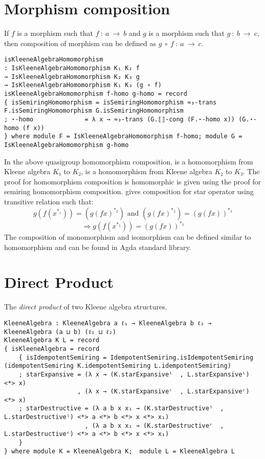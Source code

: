 \section{Morphism composition}
If $f$ is a morphism such that $f\ :\ a \ \rightarrow \ b$ and $g$ is a morphism
such that $g\ :\ b\ \rightarrow \ c$, then composition of morphism can be
defined as $g \ ∘\ f\ :\ a \ \rightarrow \ c$.
\begin{verbatim}
isKleeneAlgebraHomomorphism
: IsKleeneAlgebraHomomorphism K₁ K₂ f
→ IsKleeneAlgebraHomomorphism K₂ K₃ g
→ IsKleeneAlgebraHomomorphism K₁ K₃ (g ∘ f)
isKleeneAlgebraHomomorphism f-homo g-homo = record
{ isSemiringHomomorphism = isSemiringHomomorphism ≈₃-trans F.isSemiringHomomorphism G.isSemiringHomomorphism
; ⋆-homo              = λ x → ≈₃-trans (G.⟦⟧-cong (F.⋆-homo x)) (G.⋆-homo (f x))
} where module F = IsKleeneAlgebraHomomorphism f-homo; module G = IsKleeneAlgebraHomomorphism g-homo
\end{verbatim}
In the above quasigroup homomorphism composition,  is a homomorphism
from Kleene algebra $K₁$ to $K₂$,  is a homomorphism from Kleene
algebra $K₂$ to $K₃$. The proof for homomorphism composition is homomorphic is
given using the proof for semiring homomorphism composition. 
gives composition for star operator using transitive relation such that: 
\[g (f (x^{*_1})) = (g (f x) ^{*_2}) \text{ and } (g (f x) ^{*_2}) = (g (f x))^{*_3}\] 
\[\Rightarrow g (f (x^{*_1})) = (g (f x))^{*_3}\] The composition of
monomorphism and isomorphism can be defined similar to homomorphism and can be
found in Agda standard library.

\section{Direct Product}
The \textit{direct product} of two Kleene algebra structures.
\begin{verbatim}
KleeneAlgebra : KleeneAlgebra a ℓ₁ → KleeneAlgebra b ℓ₂ → KleeneAlgebra (a ⊔ b) (ℓ₁ ⊔ ℓ₂)
KleeneAlgebra K L = record
{ isKleeneAlgebra = record
    { isIdempotentSemiring = IdempotentSemiring.isIdempotentSemiring (idempotentSemiring K.idempotentSemiring L.idempotentSemiring)
    ; starExpansive = (λ x → (K.starExpansiveˡ  , L.starExpansiveˡ) <*> x)
                    , (λ x → (K.starExpansiveʳ  , L.starExpansiveʳ) <*> x)
    ; starDestructive = (λ a b x x₁ → (K.starDestructiveˡ  , L.starDestructiveˡ) <*> a <*> b <*> x <*> x₁)
                      , (λ a b x x₁ → (K.starDestructiveʳ  , L.starDestructiveʳ) <*> a <*> b <*> x <*> x₁)
    }
} where module K = KleeneAlgebra K;  module L = KleeneAlgebra L
\end{verbatim}

